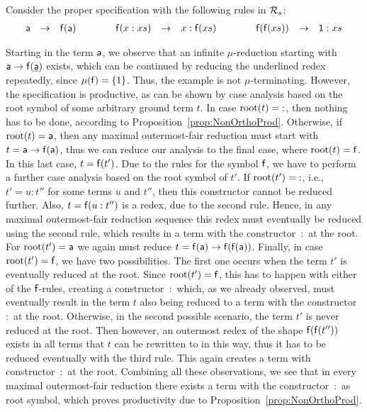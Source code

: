 \documentclass{eptcs}
\begin{document}
\begin{example}
\label{ex:IncompleteCSterm}
Consider the proper specification with the following rules in $\mathcal{R}_s$:
\[
\begin{array}{rcl@{\qquad\qquad}rcl@{\qquad\qquad}rcl}
\fsym{a} &\to& \fsym{f}(\fsym{a})
&
\fsym{f}(x:xs) &\to& x : \fsym{f}(xs)
&
\fsym{f}(\fsym{f}(xs)) &\to& \one : xs
\end{array}
\]

Starting in the term $\mathsf{a}$, we observe that an infinite $\mu$-reduction
starting with $\mathsf{a} \to \mathsf{f}(\underline{\mathsf{a}})$ exists,
which can be continued by reducing the underlined redex repeatedly, since
$\mu(\mathsf{f}) = \{ 1 \}$.
Thus, the example is not $\mu$-terminating. However, the specification is
productive, as can be shown by case analysis based on the root symbol of
some arbitrary ground term $t$. In case $\mathrm{root}(t) = {:}$, then nothing has to be
done, according to Proposition~\ref{prop:NonOrthoProd}.
Otherwise, if $\mathrm{root}(t) = \mathsf{a}$, then any maximal outermost-fair reduction
must start with $t = \mathsf{a} \to \mathsf{f}(\mathsf{a})$, thus we can reduce our
analysis to the final case, where $\mathrm{root}(t) = \mathsf{f}$. In this last case,
$t = \mathsf{f}(t')$. Due to the rules for the symbol $\mathsf{f}$, we have to
perform a further case analysis based on the root symbol of $t'$.
If $\mathrm{root}(t') = {:}$, i.e., $t' = u:t''$ for some terms $u$ and $t''$,
then this constructor cannot be reduced further.
Also, $t = \mathsf{f}(u:t'')$ is a redex, due to the second rule.
Hence, in any maximal outermost-fair reduction sequence this redex must
eventually be reduced using the second rule, which results in a term with the
constructor~$:$ at the root.
For $\mathrm{root}(t') = \mathsf{a}$ we again must reduce
$t = \mathsf{f}(\mathsf{a}) \to \mathsf{f}(\mathsf{f}(\mathsf{a}))$.
Finally, in case $\mathrm{root}(t') = \mathsf{f}$, we have two possibilities. The first
one occurs when the term $t'$ is eventually reduced at the root. Since
$\mathrm{root}(t') = \mathsf{f}$, this has to happen with either of the $\mathsf{f}$-rules,
creating a constructor~$:$ which, as we already observed, must eventually result
in the term $t$ also being reduced to a term with the constructor~$:$ at the
root. Otherwise, in the second possible scenario, the term $t'$ is never reduced
at the root. Then however, an outermost redex of the shape
$\mathsf{f}(\mathsf{f}(t''))$ exists in all terms that $t$ can be rewritten to in
this way, thus it has to be reduced eventually with the third rule. This again
creates a term with constructor~$:$ at the root. Combining all these
observations, we see that in every maximal outermost-fair reduction there exists
a term with the constructor~$:$ as root symbol, which proves productivity due to
Proposition~\ref{prop:NonOrthoProd}.
\end{example}
\end{document}
